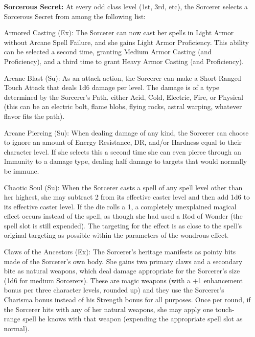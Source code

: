 \textbf{Sorcerous Secret:} At every odd class level (1st, 3rd, etc), the Sorcerer selects a Sorcerous Secret from among the following list:

\begin{description*}

\item[Armored Casting (Ex):] The Sorcerer can now cast her spells in Light Armor without Arcane Spell Failure, and she gains Light Armor Proficiency. This ability can be selected a second time, granting Medium Armor Casting (and Proficiency), and a third time to grant Heavy Armor Casting (and Proficiency).

\item[Arcane Blast (Su):] As an attack action, the Sorcerer can make a Short Ranged Touch Attack that deals 1d6 damage per level. The damage is of a type determined by the Sorcerer's Path, either Acid, Cold, Electric, Fire, or Physical (this can be an electric bolt, flame blobs, flying rocks, astral warping, whatever flavor fits the path).

\item[Arcane Piercing (Su):] When dealing damage of any kind, the Sorcerer can choose to ignore an amount of Energy Resistance, DR, and/or Hardness equal to their character level. If she selects this a second time she can even pierce through an Immunity to a damage type, dealing half damage to targets that would normally be immune.

\item[Chaotic Soul (Su):] When the Sorcerer casts a spell of any spell level other than her highest, she may subtract 2 from its effective caster level and then add 1d6 to its effective caster level. If the die rolls a 1, a completely unexplained magical effect occurs instead of the spell, as though she had used a Rod of Wonder (the spell slot is still expended). The targeting for the effect is as close to the spell's original targeting as possible within the parameters of the wondrous effect.

\item[Claws of the Ancestors (Ex):] The Sorcerer's heritage manifests as pointy bits made of the Sorcerer's own body. She gains two primary claws and a secondary bite as natural weapons, which deal damage appropriate for the Sorcerer's size (1d6 for medium Sorcerers). These are magic weapons (with a +1 enhancement bonus per three character levels, rounded up) and they use the Sorcerer's Charisma bonus instead of his Strength bonus for all purposes. Once per round, if the Sorcerer hits with any of her natural weapons, she may apply one touch-range spell he knows with that weapon (expending the appropriate spell slot as normal).


\end{description*}
